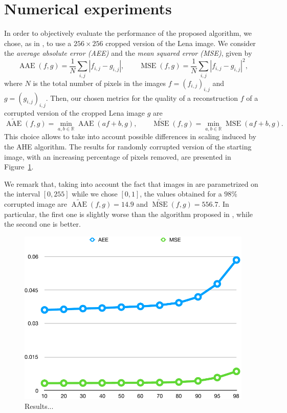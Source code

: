 \documentclass[proc]{edpsmath}
\begin{document}
{\color{magenta}
\section{Numerical experiments}

In order to objectively evaluate the performance of the proposed algorithm, we chose, as in \cite{GWWBBS}, to use a $256\times 256$ cropped version of the Lena image. We consider the \emph{average absolute error (AEE)} and the \emph{mean squared error (MSE)}, given by
\begin{equation}
  \operatorname{AAE}(f,g) = \frac{1}{N}\sum_{i,j} |f_{i,j}-g_{i,j}|,\qquad
  \operatorname{MSE}(f,g) = \frac{1}{N}\sum_{i,j} |f_{i,j}-g_{i,j}|^2,
\end{equation}
where $N$ is the total number of pixels in the images $f=(f_{i,j})_{i,j}$ and $g=(g_{i,j})_{i,j}$. Then, our chosen metrics for the quality of a reconstruction $f$ of a corrupted version of the cropped Lena image $g$ are
\begin{equation}
  \widetilde{\operatorname{AAE}}(f,g) = \min_{a,b\in\mathbb R}\operatorname{AAE}(a f+b,g),\qquad
  \widetilde{\operatorname{MSE}}(f,g) = \min_{a,b\in\mathbb R}\operatorname{MSE}(a f+b,g).
\end{equation}
This choice allows to take into account possible differences in scaling induced by the AHE algorithm. The results for randomly corrupted version of the starting image, with an increasing percentage of pixels removed, are presented in Figure~\ref{fig:graph}. 

We remark that, taking into account the fact that images in \cite{GWWBBS} are parametrized on the interval $[0,255]$ while we chose $[0,1]$, the values obtained for a $98\%$ corrupted image are $\widetilde{\operatorname{AAE}}(f,g)=14.9$ and $\widetilde{\operatorname{MSE}}(f,g)=556.7$. In particular, the first one is slightly worse than the algorithm proposed in \cite{GWWBBS}, while the second one is better.

\begin{figure}
  \includegraphics[width=.4\textwidth]{graphAEE-MSE}
  \caption{Results...}
  \label{fig:graph}
\end{figure}
}
\end{document}
